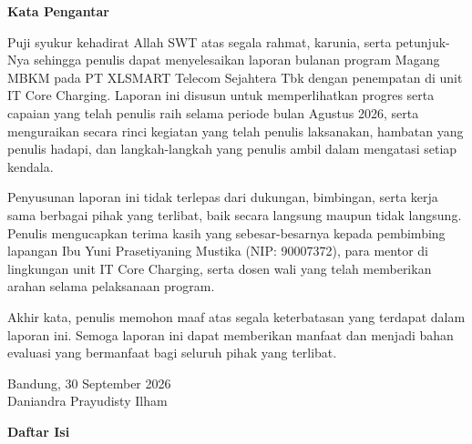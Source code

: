 \documentclass[12pt,a4paper]{article}
\begin{document}
\clearpage
\setcounter{page}{3}

\begin{center}
    {\bfseries\large Kata Pengantar\par}
\end{center}
\vspace{0.6cm}

Puji syukur kehadirat Allah SWT atas segala rahmat, karunia, serta petunjuk-Nya sehingga penulis dapat menyelesaikan laporan bulanan program Magang MBKM pada PT XLSMART Telecom Sejahtera Tbk dengan penempatan di unit IT Core Charging. Laporan ini disusun untuk memperlihatkan progres serta capaian yang telah penulis raih selama periode bulan Agustus 2026, serta menguraikan secara rinci kegiatan yang telah penulis laksanakan, hambatan yang penulis hadapi, dan langkah-langkah yang penulis ambil dalam mengatasi setiap kendala.

Penyusunan laporan ini tidak terlepas dari dukungan, bimbingan, serta kerja sama berbagai pihak yang terlibat, baik secara langsung maupun tidak langsung. Penulis mengucapkan terima kasih yang sebesar-besarnya kepada pembimbing lapangan Ibu Yuni Prasetiyaning Mustika (NIP: 90007372), para mentor di lingkungan unit IT Core Charging, serta dosen wali yang telah memberikan arahan selama pelaksanaan program. 

Akhir kata, penulis memohon maaf atas segala keterbatasan yang terdapat dalam laporan ini. Semoga laporan ini dapat memberikan manfaat dan menjadi bahan evaluasi yang bermanfaat bagi seluruh pihak yang terlibat.

\vspace{1.2cm}
\noindent
\begin{flushright}
    Bandung, 30 September 2026\\[2.0cm]
    Daniandra Prayudisty Ilham
\end{flushright}

\clearpage
\setcounter{page}{4}

\begin{center}
    {\bfseries\large Daftar Isi\par}
\end{center}
\vspace{0.6cm}
\end{document}
